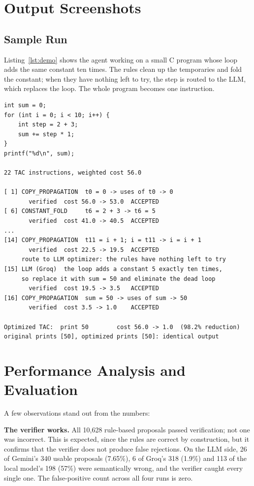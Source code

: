 \documentclass[12pt,a4paper]{report}
\begin{document}
\section{Output Screenshots}

\subsection{Sample Run}

Listing~\ref{lst:demo} shows the agent working on a small C program whose loop adds the same constant ten times. The rules clean up the temporaries and fold the constant; when they have nothing left to try, the step is routed to the LLM, which replaces the loop. The whole program becomes one instruction.

\begin{lstlisting}[caption={A real run of the demo on a C loop, with Groq as the LLM (shortened)}, label=lst:demo]
int sum = 0;
for (int i = 0; i < 10; i++) {
    int step = 2 + 3;
    sum += step * 1;
}
printf("%d\n", sum);

22 TAC instructions, weighted cost 56.0

[ 1] COPY_PROPAGATION  t0 = 0 -> uses of t0 -> 0
       verified  cost 56.0 -> 53.0  ACCEPTED
[ 6] CONSTANT_FOLD     t6 = 2 + 3 -> t6 = 5
       verified  cost 41.0 -> 40.5  ACCEPTED
...
[14] COPY_PROPAGATION  t11 = i + 1; i = t11 -> i = i + 1
       verified  cost 22.5 -> 19.5  ACCEPTED
     route to LLM optimizer: the rules have nothing left to try
[15] LLM (Groq)  the loop adds a constant 5 exactly ten times,
     so replace it with sum = 50 and eliminate the dead loop
       verified  cost 19.5 -> 3.5   ACCEPTED
[16] COPY_PROPAGATION  sum = 50 -> uses of sum -> 50
       verified  cost 3.5 -> 1.0    ACCEPTED

Optimized TAC:  print 50        cost 56.0 -> 1.0  (98.2% reduction)
original prints [50], optimized prints [50]: identical output
\end{lstlisting}

\section{Performance Analysis and Evaluation}

A few observations stand out from the numbers:

\textbf{The verifier works.} All 10,628 rule-based proposals passed verification; not one was incorrect. This is expected, since the rules are correct by construction, but it confirms that the verifier does not produce false rejections. On the LLM side, 26 of Gemini's 340 usable proposals (7.65\%), 6 of Groq's 318 (1.9\%) and 113 of the local model's 198 (57\%) were semantically wrong, and the verifier caught every single one. The false-positive count across all four runs is zero.
\end{document}
